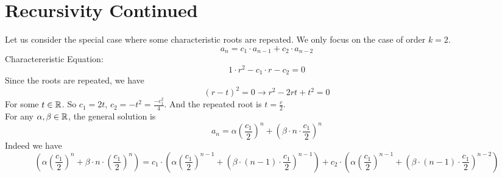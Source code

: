 \documentclass[openany]{report}
\begin{document}
\chapter{Recursivity Continued}
Let us consider the special case where some characteristic roots are repeated. We only focus on the case of order $k=2$.
\[a_n = c_1 \cdot a_{n-1} + c_2 \cdot a_{n-2}\]
Charactereristic Equation: 
\[1 \cdot r^2 - c_1 \cdot r - c_2 = 0\]
Since the roots are repeated, we have 
\[(r-t)^2 = 0 \rightarrow r^2 - 2rt + t^2 = 0\]
For some $t \in \mathbb{R}$. So $c_1 = 2t$, $c_2 = -t^2 = \frac{-c_1^2}{4}$. And the repeated root is $t = \frac{c}{2}$.\\[2ex]
For any $\alpha, \beta \in \mathbb{R}$, the general solution is 
\[a_n = \alpha \left(\frac{c_1}{2}\right)^n + \left(\beta \cdot n \cdot \frac{c_1}{2} \right)^n\]
Indeed we have
\[\left(\alpha  \left(\frac{c_1}{2}\right)^n + \beta \cdot n \cdot \left( \frac{c_1}{2} \right)^n \right) = c_1 \cdot \left(\alpha  \left(\frac{c_1}{2}\right)^{n-1} + \left(\beta \cdot (n-1) \cdot \frac{c_1}{2} \right)^{n-1} \right) + c_2 \cdot \left(\alpha  \left(\frac{c_1}{2}\right)^{n-1} + \left(\beta \cdot (n-1) \cdot \frac{c_1}{2} \right)^{n-2} \right)\]
\end{document}
